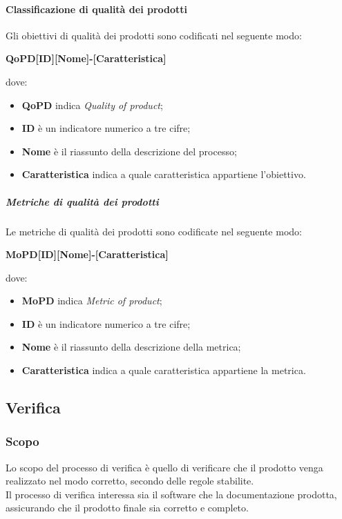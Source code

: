 \documentclass[../norme-di-progetto.tex]{subfiles}
\begin{document}
\paragraph{Classificazione di qualità dei prodotti}
Gli obiettivi di qualità dei prodotti sono codificati nel seguente modo: \\
\begin{center}
  \centering
  \textbf{QoPD[ID][Nome]-[Caratteristica]}
\end{center} dove:
\begin{itemize}
  \item \textbf{QoPD} indica \textit{Quality of product};
  \item \textbf{ID} è un indicatore numerico a tre cifre;
  \item \textbf{Nome} è il riassunto della descrizione del processo;
  \item \textbf{Caratteristica} indica a quale caratteristica appartiene l'obiettivo.
\end{itemize}

\subparagraph{Metriche di qualità dei prodotti}
Le metriche di qualità dei prodotti sono codificate nel seguente modo:
\begin{center}
  \centering
  \textbf{MoPD[ID][Nome]-[Caratteristica]}
\end{center} dove:
\begin{itemize}
  \item \textbf{MoPD} indica \textit{Metric of product};
  \item \textbf{ID} è un indicatore numerico a tre cifre;
  \item \textbf{Nome} è il riassunto della descrizione della metrica;
  \item \textbf{Caratteristica} indica a quale caratteristica appartiene la metrica.
\end{itemize}

\subsection{Verifica}

\subsubsection{Scopo}
Lo scopo del processo di verifica è quello di verificare che il prodotto venga realizzato nel modo corretto, secondo delle regole stabilite. \\
Il processo di verifica interessa sia il software che la documentazione prodotta, assicurando che il prodotto finale sia corretto e completo.
\end{document}
